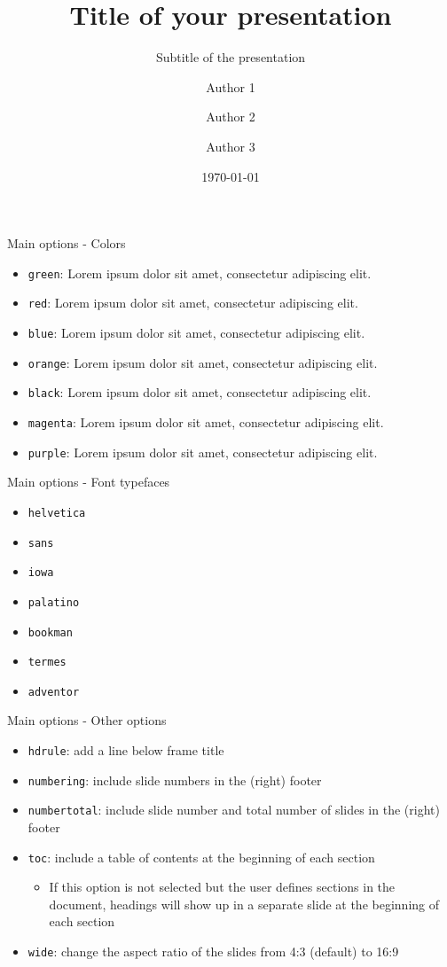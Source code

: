 \documentclass[numbertotal,blue,toc,wide]{bpslides}
\title{Title of your presentation}
\subtitle{Subtitle of the presentation}
\author{Author 1\inst{1} \and Author 2\inst{2} \and Author 3\inst{3}}
\institute{\inst{1} Institution 1, \  \inst{2} Institution 2, \  \inst{3} Institution 3}
\date{\today}
\begin{document}
\begin{frame}[plain]
	\titlepage
\end{frame}

\begin{frame}{Main options - Colors}\label{firstslide}
\begin{itemize}
\item \texttt{green}: {\color{green0}Lorem ipsum dolor sit amet, consectetur adipiscing elit}.\hfill {}
\item \texttt{red}: {\color{red0}Lorem ipsum dolor sit amet, consectetur adipiscing elit}.
\item \texttt{blue}: {\color{blue0}Lorem ipsum dolor sit amet, consectetur adipiscing elit}.
\item \texttt{orange}: {\color{orange0}Lorem ipsum dolor sit amet, consectetur adipiscing elit}.
\item \texttt{black}: {\color{black}Lorem ipsum dolor sit amet, consectetur adipiscing elit}.
\item \texttt{magenta}: {\color{magenta0}Lorem ipsum dolor sit amet, consectetur adipiscing elit}.
\item \texttt{purple}: {\color{purple0}Lorem ipsum dolor sit amet, consectetur adipiscing elit}.
\end{itemize}
\end{frame}

\begin{frame}{Main options - Font typefaces}\label{firstslide}
\begin{itemize}
\item \texttt{helvetica}
\item \texttt{sans}
\item \texttt{iowa}
\item \texttt{palatino}
\item \texttt{bookman}
\item \texttt{termes}
\item \texttt{adventor}
\end{itemize}
\end{frame}

\begin{frame}{Main options - Other options}\label{firstslide}
\begin{itemize}
\item \texttt{hdrule}: add a line below frame title
\item \texttt{numbering}: include slide numbers in the (right) footer
\item \texttt{numbertotal}: include slide number and total number of slides in the (right) footer
\item \texttt{toc}: include a table of contents at the beginning of each section
\begin{itemize}
\item If this option is not selected but the user defines sections in the document, headings will show up in a separate slide at the beginning of each section
\end{itemize}
\item \texttt{wide}: change the aspect ratio of the slides from 4:3 (default) to 16:9
\end{itemize}
\end{frame}
\end{document}
